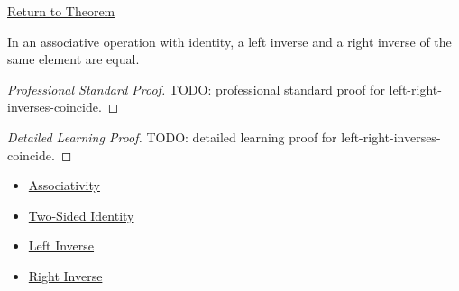 \newpage
{}
\label{prf:left-right-inverses-coincide}

\begin{remark*}[Return]
\hyperref[lem:left-right-inverses-coincide]{Return to Theorem}
\end{remark*}

\begin{lemma*}
In an associative operation with identity, a left inverse and a right inverse
of the same element are equal.
\end{lemma*}

\begin{proof}[Professional Standard Proof]
\LRAProofBodyStart
TODO: professional standard proof for left-right-inverses-coincide.
\end{proof}

\begin{proof}[Detailed Learning Proof]
\LRAProofBodyStart
TODO: detailed learning proof for left-right-inverses-coincide.
\end{proof}

\begin{remark*}
\end{remark*}

\begin{dependencies}
\begin{itemize}
  \item \hyperref[def:associativity]{Associativity}
  \item \hyperref[def:two-sided-identity]{Two-Sided Identity}
  \item \hyperref[def:left-inverse]{Left Inverse}
  \item \hyperref[def:right-inverse]{Right Inverse}
\end{itemize}
\end{dependencies}

\clearpage

